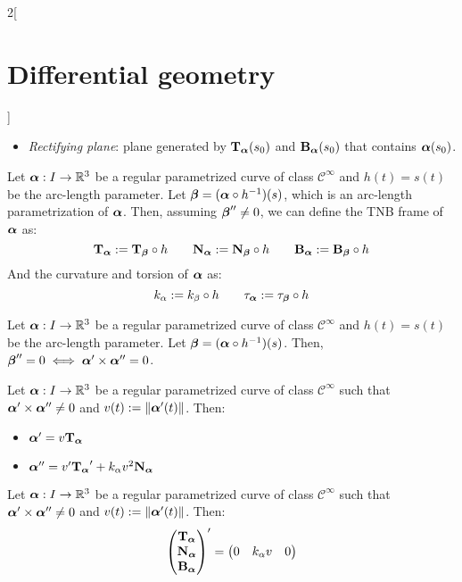 \documentclass[../../../main.tex]{subfiles}
\begin{document}
\begin{multicols}{2}[\section{Differential geometry}]
\begin{definition}
\begin{itemize}
      \item \emph{Rectifying plane}: plane generated by $\T\alpha(s_0)$ and $\B\alpha(s_0)$ that contains $\vf{\alpha}(s_0)$.
    \end{itemize}
  \end{definition}
  \begin{proposition}
    Let $\vf{\alpha}:I\rightarrow\RR^3$ be a regular parametrized curve of class $\mathcal{C}^\infty$ and $h(t)=s(t)$ be the arc-length parameter. Let $\vf{\beta}=(\vf{\alpha}\circ h^{-1})(s)$, which is an arc-length parametrization of $\vf{\alpha}$. Then, assuming $\vf{\beta}''\ne 0$, we can define the TNB frame of $\vf{\alpha}$ as: $$\T\alpha:=\T\beta\circ h\qquad\N\alpha:=\N\beta\circ h\qquad\B\alpha:=\B\beta\circ h$$
    And the curvature and torsion of $\vf\alpha$ as: $$k_\alpha:=k_\beta\circ h\qquad\ta\alpha:=\ta\beta\circ h$$
  \end{proposition}
  \begin{lemma}
    Let $\vf{\alpha}:I\rightarrow\RR^3$ be a regular parametrized curve of class $\mathcal{C}^\infty$ and $h(t)=s(t)$ be the arc-length parameter. Let $\vf{\beta}=(\vf{\alpha}\circ h^{-1})(s)$. Then, $\vf{\beta}''=0\iff\vf\alpha'\times\vf\alpha''=0$.
  \end{lemma}
  \begin{proposition}
    Let $\vf{\alpha}:I\rightarrow\RR^3$ be a regular parametrized curve of class $\mathcal{C}^\infty$ such that $\vf{\alpha}'\times \vf{\alpha}''\ne 0$ and $v(t):=\|\vf{\alpha}'(t)\|$. Then:
    \begin{itemize}
      \item $\vf{\alpha}'=v\T\alpha$
      \item $\vf{\alpha}''=v'\T\alpha'+k_\alpha v^2\N\alpha$
    \end{itemize}
  \end{proposition}
  \begin{theorem}
    Let $\vf{\alpha}:I\rightarrow\RR^3$ be a regular parametrized curve of class $\mathcal{C}^\infty$ such that $\vf{\alpha}'\times \vf{\alpha}''\ne 0$ and $v(t):=\|\vf{\alpha}'(t)\|$. Then:
    $$
      \begin{pmatrix}
        \T\alpha \\
        \N\alpha \\
        \B\alpha \\
      \end{pmatrix}'=
      \begin{pmatrix}
        0           & k_\alpha v  & 0            \\

\end{pmatrix}$$
\end{theorem}
\end{multicols}
\end{document}
